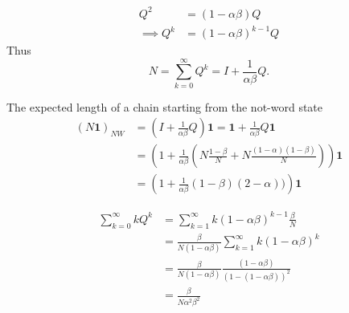 \documentclass[11pt]{article}
\begin{document}
\begin{align}
Q^2 &= (1-\alpha\beta)Q\\
\implies Q^k &= (1-\alpha\beta)^{k-1}Q
\end{align}
Thus
\begin{equation}
N = \sum_{k=0}^\infty Q^k = I + \frac{1}{\alpha\beta}Q.
\end{equation}

The expected length of a chain starting from the not-word state
\begin{align}
(N\mathbf{1})_{NW} &= (I + \frac{1}{\alpha\beta}Q)\mathbf{1} = \mathbf{1} + \frac{1}{\alpha\beta}Q\mathbf{1} \\ &= \left(1 + \frac{1}{\alpha\beta}\left(N\frac{1-\beta}{N} + N\frac{(1-\alpha)(1-\beta)}{N}\right)\right)\mathbf{1} \\
&=\left(1 + \frac{1}{\alpha\beta}(1-\beta)(2-\alpha))\right)\mathbf{1}
\end{align}

\begin{align}
\sum_{k=0}^\infty k Q^k &= \sum_{k=1}^\infty k(1-\alpha\beta)^{k-1}\frac{\beta}{N}\\
&=\frac{\beta}{N(1-\alpha\beta)}\sum_{k=1}^\infty k(1-\alpha\beta)^k \\
&=\frac{\beta}{N(1-\alpha\beta)}\frac{(1-\alpha\beta)}{(1-(1-\alpha\beta))^2}\\ & = \frac{\beta}{N\alpha^2\beta^2}
\end{align}


\appendix
\end{document}
